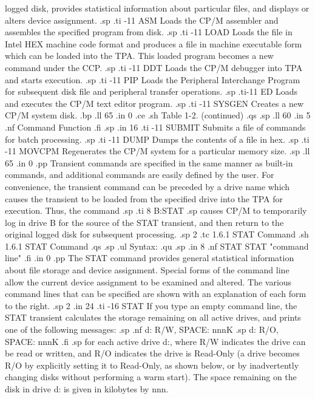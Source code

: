 logged disk, provides statistical information about particular files, and
displays or alters device assignment.
.sp
.ti -11
ASM        Loads the CP/M assembler and assembles the specified program from
disk.
.sp
.ti -11
LOAD       Loads the file in Intel HEX machine code format and produces a
file in machine executable form which can be loaded into the TPA.  This loaded
program becomes a new command under the CCP.
.sp
.ti -11
DDT        Loads the CP/M debugger into TPA and starts execution.
.sp
.ti -11
PIP        Loads the Peripheral Interchange Program for subsequent disk file
and peripheral transfer operations.
.sp
.ti-11
ED         Loads and executes the CP/M text editor program.
.sp
.ti -11
SYSGEN     Creates a new CP/M system disk.
.bp
.ll 65
.in 0
.ce
.sh
Table 1-2.  (continued)
.qs
.sp
.ll 60
.in 5
.nf
Command                      Function
.fi
.sp
.in 16
.ti -11
SUBMIT     Submits a file of commands for batch processing.
.sp
.ti -11
DUMP       Dumps the contents of a file in hex.
.sp
.ti -11
MOVCPM     Regenerates the CP/M system for a particular memory size.
.sp
.ll 65
.in 0
.pp
Transient commands are specified in the same manner as built-in commands, and
additional commands are easily defined by the user.  For convenience, the
transient command can be preceded by a drive name which causes the transient
to be loaded from the specified drive into the TPA for execution.  Thus, the
command
.sp
.ti 8
B:STAT
.sp
causes CP/M to temporarily log in drive B for the source of the STAT
transient, and then return to the original logged disk for subsequent
processing.
.sp 2
.tc         1.6.1  STAT Command
.sh
1.6.1  STAT Command
.qs
.sp
.ul
Syntax:
.qu
.sp
.in 8
.nf
STAT
STAT "command line"
.fi
.in 0
.pp
The STAT command provides general statistical information about file storage
and device assignment.  Special forms of the command line allow the current
device assignment to be
examined and altered.  The various command lines that can be specified are
shown with an explanation of each form to the right.
.sp 2
.in 24
.ti -16
STAT            If you type an empty command line, the STAT transient
calculates the storage remaining on all active drives, and prints 
one of the following messages:
.sp
.nf
d: R/W, SPACE:  nnnK
.sp
d: R/O, SPACE:  nnnK
.fi
.sp
for each active drive d:, where R/W indicates the drive can be read or
written, and R/O indicates the drive is Read-Only (a drive becomes R/O by
explicitly setting it to Read-Only, as shown below, or by inadvertently
changing disks without performing a warm start).  The space remaining on
the disk in drive d: is given in kilobytes by nnn.
